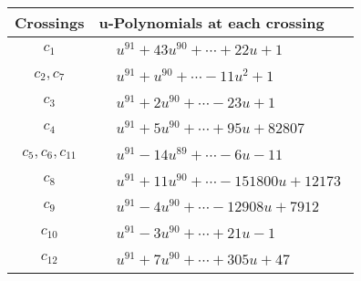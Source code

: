 \documentclass[1p]{elsarticle_modified}
\theoremstyle{definition}
\begin{document}
\begin{tabular}{m{50pt}|m{274pt}}
Crossings & \hspace{64pt}u-Polynomials at each crossing \\
\hline $$\begin{aligned}c_{1}\end{aligned}$$&$\begin{aligned}
&u^{91}+43 u^{90}+\cdots+22 u+1
\end{aligned}$\\
\hline $$\begin{aligned}c_{2},c_{7}\end{aligned}$$&$\begin{aligned}
&u^{91}+u^{90}+\cdots-11 u^2+1
\end{aligned}$\\
\hline $$\begin{aligned}c_{3}\end{aligned}$$&$\begin{aligned}
&u^{91}+2 u^{90}+\cdots-23 u+1
\end{aligned}$\\
\hline $$\begin{aligned}c_{4}\end{aligned}$$&$\begin{aligned}
&u^{91}+5 u^{90}+\cdots+95 u+82807
\end{aligned}$\\
\hline $$\begin{aligned}c_{5},c_{6},c_{11}\end{aligned}$$&$\begin{aligned}
&u^{91}-14 u^{89}+\cdots-6 u-11
\end{aligned}$\\
\hline $$\begin{aligned}c_{8}\end{aligned}$$&$\begin{aligned}
&u^{91}+11 u^{90}+\cdots-151800 u+12173
\end{aligned}$\\
\hline $$\begin{aligned}c_{9}\end{aligned}$$&$\begin{aligned}
&u^{91}-4 u^{90}+\cdots-12908 u+7912
\end{aligned}$\\
\hline $$\begin{aligned}c_{10}\end{aligned}$$&$\begin{aligned}
&u^{91}-3 u^{90}+\cdots+21 u-1
\end{aligned}$\\
\hline $$\begin{aligned}c_{12}\end{aligned}$$&$\begin{aligned}
&u^{91}+7 u^{90}+\cdots+305 u+47
\end{aligned}$\\
\hline
\end{tabular}\\~\\
\end{document}
